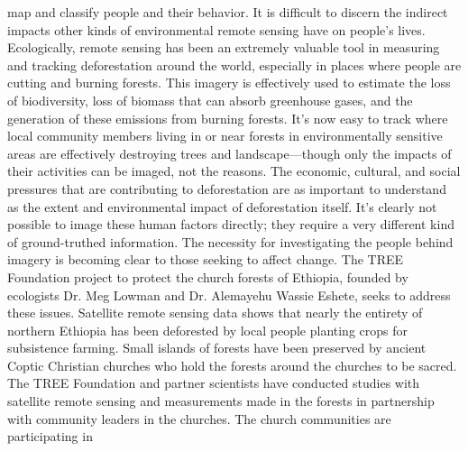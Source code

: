 map and classify people and their behavior. It is difficult to discern the
indirect impacts other kinds of environmental remote sensing have on
people's lives. Ecologically, remote sensing has been an extremely valuable
tool in measuring and tracking deforestation around the world, especially
in places where people are cutting and burning forests. This imagery is
effectively used to estimate the loss of biodiversity, loss of biomass that
can absorb greenhouse gases, and the generation of these emissions from
burning forests. It's now easy to track where local community members
living in or near forests in environmentally sensitive areas are effectively
destroying trees and landscape—though only the impacts of their activities
can be imaged, not the reasons. The economic, cultural, and social pressures
that are contributing to deforestation are as important to understand
as the extent and environmental impact of deforestation itself. It's clearly
not possible to image these human factors directly; they require a very different
kind of ground-truthed information.
The necessity for investigating the people behind imagery is becoming clear
to those seeking to affect change. The TREE Foundation project to protect
the church forests of Ethiopia, founded by ecologists Dr. Meg Lowman and
Dr. Alemayehu Wassie Eshete, seeks to address these issues. Satellite remote
sensing data shows that nearly the entirety of northern Ethiopia has been
deforested by local people planting crops for subsistence farming. Small
islands of forests have been preserved by ancient Coptic Christian churches
who hold the forests around the churches to be sacred. The TREE Foundation
and partner scientists have conducted studies with satellite remote
sensing and measurements made in the forests in partnership with community
leaders in the churches. The church communities are participating in

